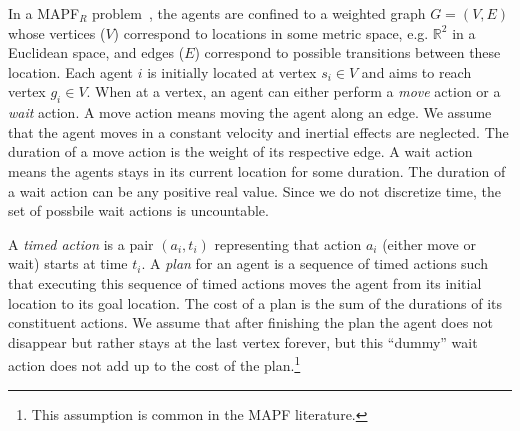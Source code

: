 \documentclass[letterpaper]{article} %
\newcommand\roni[1]{\nb{\textbf{Roni:}}{orange}{#1}}
\newcommand{\mapfr}{{MAPF}$_R$\xspace}
\begin{document}
In a \mapfr problem~\cite{walker2018extended}, the agents are confined to a weighted graph $G=(V, E)$ whose vertices ($V$) correspond to locations in some metric space, e.g. $\mathbb{R}^2$ in a Euclidean space, and edges ($E$) correspond to possible transitions between these location.
Each agent $i$ is initially located at vertex $s_i\in V$ and aims to reach vertex $g_i\in V$.
When at a vertex, an agent can either perform a \emph{move} action or a \emph{wait} action.
A move action means moving the agent along an edge.
We assume that the agent moves in a constant velocity and inertial effects are neglected.
The duration of a move action is the weight of its respective edge.
A wait action means the agents stays in its current location for some duration.
The duration of a wait action can be any positive real value. Since we do not discretize time, the set of possbile wait actions is uncountable.

A \emph{timed action} is a pair $(a_i, t_i)$ representing that action $a_i$ (either move or wait) starts at time $t_i$.
A \emph{plan} for an agent is a sequence of timed actions such that executing this sequence of timed actions moves the agent from its initial location to its goal location.
The cost of a plan is the sum of the durations of its constituent actions.
We assume that after finishing the plan the agent does not disappear but rather stays at the last vertex forever, but this ``dummy'' wait action does not add up to the cost of the plan.\footnote{This assumption is common in the MAPF literature.}
\end{document}
